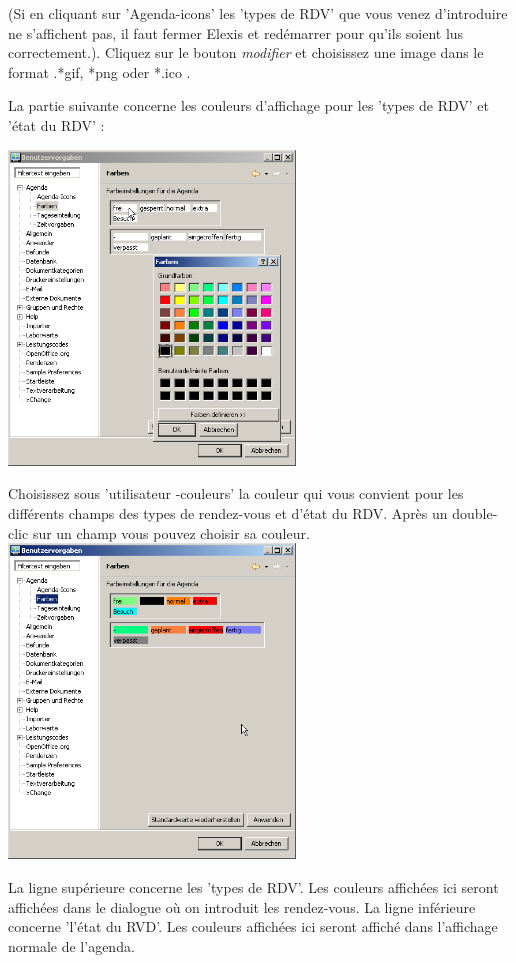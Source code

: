 (Si en cliquant sur 'Agenda-icons' les 'types de RDV' que vous venez d'introduire ne s'affichent pas, il faut fermer Elexis et redémarrer pour qu'ils soient lus correctement.).
Cliquez sur le bouton  \textit{modifier} et choisissez une image dans le format  .*gif, *png oder *.ico .

La partie suivante concerne les couleurs d'affichage pour les 'types de RDV' et 'état du RDV' :

\includegraphics[width=3in]{images/settings3}

Choisissez sous 'utilisateur -couleurs' la couleur qui vous convient pour les différents champs des types de rendez-vous et d'état du RDV. Après un double-clic sur un champ vous pouvez choisir sa couleur.
\includegraphics[width=3in]{images/settings4.png}


La ligne supérieure concerne les 'types de RDV'. Les couleurs affichées ici seront affichées dans le dialogue où on introduit les rendez-vous.
La ligne inférieure concerne 'l'état du RVD'. Les couleurs affichées ici seront affiché dans l'affichage normale de l'agenda.



